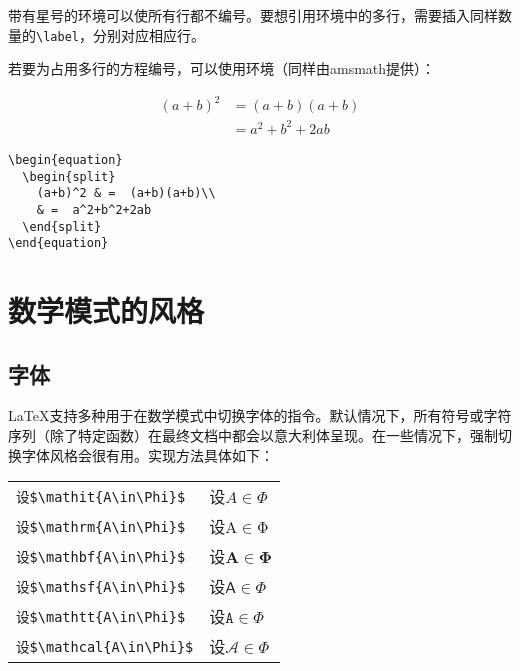 \begin{ii}
带有星号的环境可以使所有行都不编号。要想引用环境中的多行，需要插入同样数量的\verb|\label|，分别对应相应行。
\end{ii}

若要为占用多行的方程编号，可以使用环境（同样由\textsf{amsmath}提供）：

\begin{codelist}[3.23]{
  \begin{equation}
    \begin{split}
      (a+b)^2 & =  (a+b)(a+b)\\
      & =  a^2+b^2+2ab
    \end{split}
  \end{equation}
}
\begin{verbatim}
\begin{equation}
  \begin{split}
    (a+b)^2 & =  (a+b)(a+b)\\
    & =  a^2+b^2+2ab
  \end{split}
\end{equation}\end{verbatim}
\end{codelist}

\section{数学模式的风格}

\subsection{字体}

\LaTeX 支持多种用于在数学模式中切换字体的指令。默认情况下，所有符号或字符序列（除了特定函数）在最终文档中都会以意大利体呈现。在一些情况下，强制切换字体风格会很有用。实现方法具体如下：

\begin{center}
  \begin{tabular}{ll}
    \verb|设$\mathit{A\in\Phi}$| & 设$\mathit{A\in Φ}$\\
    \verb|设$\mathrm{A\in\Phi}$| & 设$\mathrm{A\in Φ}$\\
    \verb|设$\mathbf{A\in\Phi}$| & 设$\mathbf{A\in Φ}$\\
    \verb|设$\mathsf{A\in\Phi}$| & 设$\mathsf{A\in Φ}$\\
    \verb|设$\mathtt{A\in\Phi}$| & 设$\mathtt{A\in Φ}$\\
    \verb|设$\mathcal{A\in\Phi}$| & 设$\mathcal{A\in\Phi}$\\
  \end{tabular}
\end{center}


